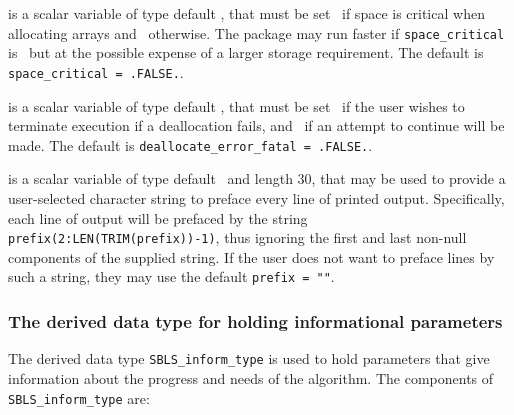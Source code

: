 \documentclass{galahad}
\newcommand{\packagename}{SBLS}
\begin{document}
\begin{description}
 is a scalar variable of type default \logical, 
that must be set \true\ if space is critical when allocating arrays
and  \false\ otherwise. The package may run faster if 
{\tt space\_critical} is \false\ but at the possible expense of a larger
storage requirement. The default is {\tt space\_critical = .FALSE.}.

 is a scalar variable of type default \logical, 
that must be set \true\ if the user wishes to terminate execution if
a deallocation  fails, and \false\ if an attempt to continue
will be made. The default is {\tt deallocate\_error\_fatal = .FALSE.}.

 is a scalar variable of type default \character\
and length 30, that may be used to provide a user-selected 
character string to preface every line of printed output. 
Specifically, each line of output will be prefaced by the string 
{\tt prefix(2:LEN(TRIM(prefix))-1)},
thus ignoring the first and last non-null components of the
supplied string. If the user does not want to preface lines by such
a string, they may use the default {\tt prefix = ""}.

\end{description}


\subsubsection{The derived data type for holding informational
 parameters}\label{typeinform}
The derived data type 
{\tt \packagename\_inform\_type} 
is used to hold parameters that give information about the progress and needs 
of the algorithm. The components of 
{\tt \packagename\_inform\_type} 
are:
\end{document}
